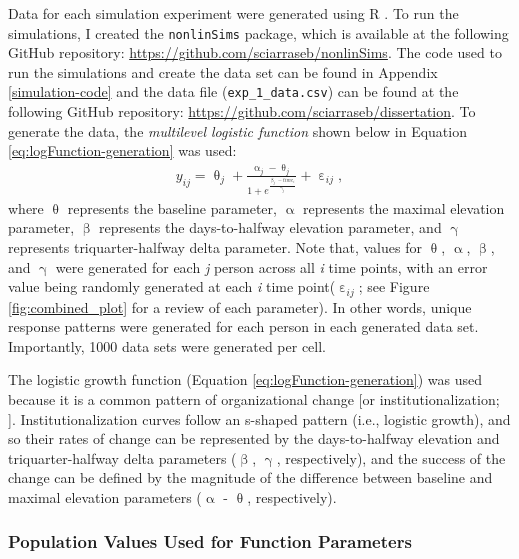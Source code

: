 \documentclass[
12pt, %
twoside,
english]{guelphthesis}
\begin{document}
Data for each simulation experiment were generated using R \autocite{rstudio}. To run the simulations, I created the \texttt{nonlinSims} package, which is available at the following GitHub repository: \url{https://github.com/sciarraseb/nonlinSims}. The code used to run the simulations and create the data set can be found in Appendix \ref{simulation-code} and the data file (\texttt{exp\_1\_data.csv}) can be found at the following GitHub repository: \url{https://github.com/sciarraseb/dissertation}. To generate the data, the \emph{multilevel logistic function} shown below in Equation \eqref{eq:logFunction-generation} was used:
\begin{align}
  y_{ij} = \uptheta_j + \frac{\upalpha_j - \uptheta_j}{{1 + e^\frac{\upbeta_j - time_i}{\upgamma_j}}} + \upepsilon_{ij}, 
\label{eq:logFunction-generation}
\end{align}
\noindent where \(\uptheta\) represents the baseline parameter, \(\upalpha\) represents the maximal elevation parameter, \(\upbeta\) represents the days-to-halfway elevation parameter, and \(\upgamma\) represents triquarter-halfway delta parameter. Note that, values for \(\uptheta\), \(\upalpha\), \(\upbeta\), and \(\upgamma\) were generated for each \emph{j} person across all \emph{i} time points, with an error value being randomly generated at each \emph{i} time point(\(\upepsilon_{ij}\); see Figure \ref{fig:combined_plot} for a review of each parameter). In other words, unique response patterns were generated for each person in each generated data set. Importantly, 1000 data sets were generated per cell.

The logistic growth function (Equation \ref{eq:logFunction-generation}) was used because it is a common pattern of organizational change {[}or institutionalization; \textcite{lawrence2001}{]}. Institutionalization curves follow an s-shaped pattern (i.e., logistic growth), and so their rates of change can be represented by the days-to-halfway elevation and triquarter-halfway delta parameters (\(\upbeta\), \(\upgamma\), respectively), and the success of the change can be defined by the magnitude of the difference between baseline and maximal elevation parameters (\(\upalpha\) - \(\uptheta\), respectively).

\hypertarget{population-values-used-for-function-parameters}{%
\subsubsection{Population Values Used for Function Parameters}\label{population-values-used-for-function-parameters}}
\end{document}
